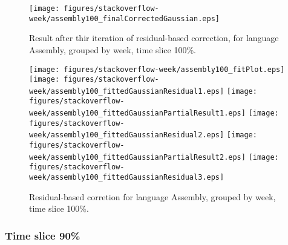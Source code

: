 \begin{figure}[]
\centering
{\texttt{[image: figures/stackoverflow-week/assembly100\_finalCorrectedGaussian.eps]}}
\caption{Result after thir iteration of residual-based correction, for language Assembly, grouped by week, time slice 100\%.}
\end{figure}


\begin{figure}[hb]
\centering
{}
{\texttt{[image: figures/stackoverflow-week/assembly100\_fitPlot.eps]}}
{\texttt{[image: figures/stackoverflow-week/assembly100\_fittedGaussianResidual1.eps]}}
{\texttt{[image: figures/stackoverflow-week/assembly100\_fittedGaussianPartialResult1.eps]}}
{\texttt{[image: figures/stackoverflow-week/assembly100\_fittedGaussianResidual2.eps]}}
{\texttt{[image: figures/stackoverflow-week/assembly100\_fittedGaussianPartialResult2.eps]}}
{\texttt{[image: figures/stackoverflow-week/assembly100\_fittedGaussianResidual3.eps]}}
\caption{Residual-based corretion for language Assembly, grouped by week, time slice 100\%.}
\end{figure}


\clearpage 
\newpage 


\FloatBarrier

\subsubsection{Time slice 90\%}

